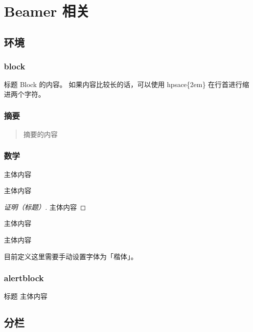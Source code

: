 \documentclass[
    10pt,
    pdf,
    UTF8,
    aspectratio=169
]{ctexbeamer}
\begin{document}
\section{Beamer 相关}

\subsection{环境}

\begin{frame}
    \frametitle{block}
    \begin{block}{标题}
        \hspace{2em} Block 的内容。
        如果内容比较长的话，可以使用  hpsace\{2em\} 在行首进行缩进两个字符。
    \end{block}
\end{frame}
\begin{frame}
    \frametitle{摘要}
    \begin{abstract}
        摘要的内容
    \end{abstract}
\end{frame}
\begin{frame}[allowframebreaks]
    \frametitle{数学}
    \begin{theorem}[标题]
        主体内容
    \end{theorem}
    \begin{lemma}[标题]
        主体内容
    \end{lemma}
    \begin{proof}[证明（标题）]
        主体内容
    \end{proof}
    \begin{corollary}[标题]
        主体内容
    \end{corollary}
    \begin{example}[标题]
        主体内容
    \end{example}
    \begin{definition}[标题]
        \kaishu 目前定义这里需要手动设置字体为「楷体」。
    \end{definition}
\end{frame}

\begin{frame}
    \frametitle{alertblock}
    \begin{alertblock}{标题}
        主体内容
    \end{alertblock}
\end{frame}

\subsection{分栏}
\end{document}
